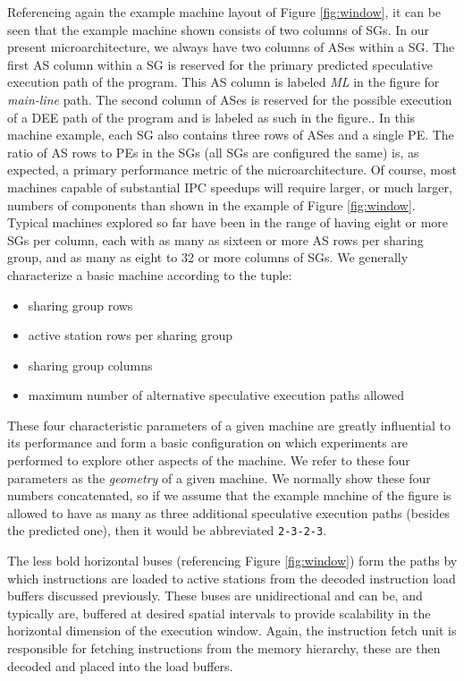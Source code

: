 \documentclass[10pt,dvips]{article}
\begin{document}
Referencing again the example machine layout
of Figure \ref{fig:window}, it can be seen that the example machine
shown consists of two columns of SGs.  
In our present microarchitecture, we always have two 
columns of ASes within a SG.
The first AS column within a SG is
reserved for the primary predicted speculative
execution path of the program.  
This AS column is labeled \textit{ML}
in the figure for \textit{main-line} path.
The second column of ASes is reserved for the possible
execution of a DEE path of the program and is labeled as such
in the figure..
In this machine example, each SG also contains three rows of ASes
and a single PE.
The ratio of AS rows to PEs in the SGs (all SGs
are configured the same) is, as expected, 
a primary performance metric of the microarchitecture.
Of course, most machines capable of substantial IPC
speedups will require larger, or much larger, numbers of
components than shown in the example of Figure \ref{fig:window}.
Typical machines explored so far have been in the
range of having eight or more SGs per column, each
with as many as sixteen or more AS rows per sharing
group, and as many as eight to 32 or more columns of SGs.
We generally characterize
a basic machine according to the tuple: 
%
\begin{itemize}
\item{sharing group rows}
\item{active station rows per sharing group}
\item{sharing group columns}
\item{maximum number of alternative speculative execution paths allowed}
\end{itemize}   
%
These four characteristic parameters of a given machine
are greatly influential to its performance 
and form a basic configuration on which experiments
are performed to explore other aspects of the machine.
We refer to these four parameters as the \textit{geometry} 
of a given machine.
We normally show these four numbers concatenated,
so if we assume that the example machine of the figure
is allowed to have as many as three
additional speculative execution paths (besides the predicted one),
then it would be abbreviated {\tt 2-3-2-3}.

The less bold horizontal buses (referencing Figure \ref{fig:window})
form the paths by which instructions are loaded to active stations
from the decoded instruction load buffers discussed previously.
These buses are unidirectional and can be, and typically are,
buffered at desired spatial intervals to provide 
scalability in the horizontal dimension
of the execution window.
Again, the instruction fetch unit is responsible for
fetching instructions from the memory hierarchy, these are then decoded
and placed into the load buffers.   
\end{document}
